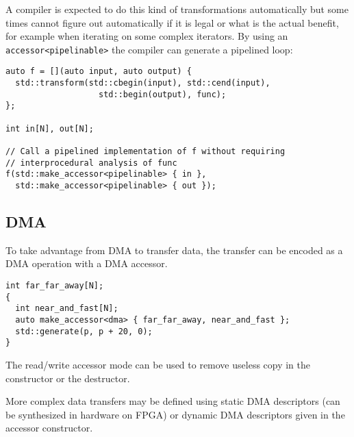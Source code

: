 \documentclass[a4paper]{article}
\begin{document}
A compiler is expected to do this kind of transformations
automatically but some times cannot figure out automatically if it is
legal or what is the actual benefit, for example when iterating on
some complex iterators. By using an \lstinline|accessor<pipelinable>|
the compiler can generate a pipelined loop:
\begin{lstlisting}
auto f = [](auto input, auto output) {
  std::transform(std::cbegin(input), std::cend(input),
                   std::begin(output), func);
};

int in[N], out[N];

// Call a pipelined implementation of f without requiring
// interprocedural analysis of func
f(std::make_accessor<pipelinable> { in },
  std::make_accessor<pipelinable> { out });
\end{lstlisting}


\subsection{DMA}
\label{sec:dma}

To take advantage from DMA to transfer data, the transfer can be
encoded as a DMA operation with a DMA accessor.

\begin{lstlisting}
int far_far_away[N];
{
  int near_and_fast[N];
  auto make_accessor<dma> { far_far_away, near_and_fast };
  std::generate(p, p + 20, 0);
}
\end{lstlisting}

The read/write accessor mode can be used to remove useless copy in the
constructor or the destructor.

More complex data transfers may be defined using static DMA
descriptors (can be synthesized in hardware on FPGA) or dynamic DMA
descriptors given in the accessor constructor.




\end{document}
